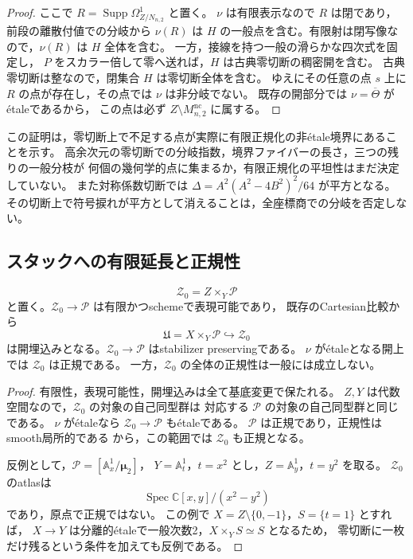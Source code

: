 \begin{proof}
ここで $R=\operatorname{Supp}\Omega^1_{Z/N_{n,2}}$ と置く。
$\nu$ は有限表示なので $R$ は閉であり，前段の離散付値での分岐から
$\nu(R)$ は $H$ の一般点を含む。有限射は閉写像なので，$\nu(R)$ は $H$ 全体を含む。
一方，接線を持つ一般の滑らかな四次式を固定し，
$P$ をスカラー倍して零へ送れば，$H$ は古典零切断の稠密開を含む。
古典零切断は整なので，閉集合 $H$ は零切断全体を含む。
ゆえにその任意の点 $s$ 上に $R$ の点が存在し，その点では $\nu$ は非分岐でない。
既存の開部分では $\nu=\overline\Theta$ が\'{e}taleであるから，
この点は必ず $Z\setminus M^{\mathrm{nc}}_{n,2}$ に属する。
\end{proof}

\begin{remark}[結論の範囲]
この証明は，零切断上で不足する点が実際に有限正規化の非\'{e}tale境界にあることを示す。
高余次元の零切断での分岐指数，境界ファイバーの長さ，三つの残りの一般分枝が
何個の幾何学的点に集まるか，有限正規化の平坦性はまだ決定していない。
また対称係数切断では $\Delta=A^2(A^2-4B^2)^2/64$ が平方となる。
その切断上で符号捩れが平方として消えることは，全座標商での分岐を否定しない。
\end{remark}

\subsection{スタックへの有限延長と正規性}

\begin{proposition}[粗正規化のスタックへの引き戻し]
\label{prop:stack-pullback-finite-normalization}
\[
 \mathcal Z_0=Z\times_Y\mathcal P
\]
と置く。$\mathcal Z_0\to\mathcal P$ は有限かつschemeで表現可能であり，
既存のCartesian比較から
\[
 \mathfrak U=X\times_Y\mathcal P\hookrightarrow\mathcal Z_0
\]
は開埋込みとなる。$\mathcal Z_0\to\mathcal P$ はstabilizer preservingである。
$\nu$ が\'{e}taleとなる開上では $\mathcal Z_0$ は正規である。
一方，$\mathcal Z_0$ の全体の正規性は一般には成立しない。
\end{proposition}
\begin{proof}
有限性，表現可能性，開埋込みは全て基底変更で保たれる。
$Z,Y$ は代数空間なので，$\mathcal Z_0$ の対象の自己同型群は
対応する $\mathcal P$ の対象の自己同型群と同じである。
$\nu$ が\'{e}taleなら $\mathcal Z_0\to\mathcal P$ も\'{e}taleである。
$\mathcal P$ は正規であり，正規性はsmooth局所的である
\cite[Tag 034F]{StacksProject}から，この範囲では $\mathcal Z_0$ も正規となる。

反例として，$\mathcal P=[\mathbb A^1_x/\boldsymbol\mu_2]$，
$Y=\mathbb A^1_t$，$t=x^2$ とし，$Z=\mathbb A^1_y$，$t=y^2$ を取る。
$\mathcal Z_0$ のatlasは
\[
 \operatorname{Spec}\mathbb C[x,y]/(x^2-y^2)
\]
であり，原点で正規ではない。
この例で $X=Z\setminus\{0,-1\}$，$S=\{t=1\}$ とすれば，
$X\to Y$ は分離的\'{e}taleで一般次数2，$X\times_Y S\simeq S$ となるため，
零切断に一枚だけ残るという条件を加えても反例である。
\end{proof}

